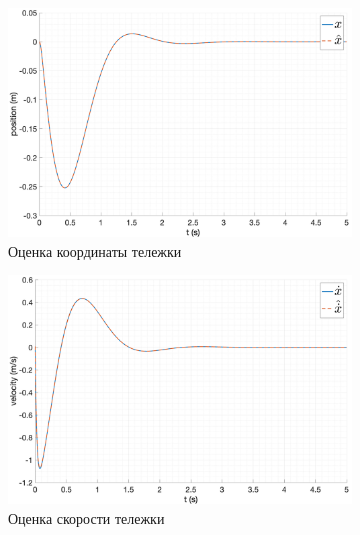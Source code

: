 \begin{figure}[ht!]
    \centering
    \begin{subfigure}[b]{0.45\textwidth}
        \includegraphics[width=\textwidth]{media/plots/reduced_observer/reduced_observer_x_cmp_1.png}
        \caption{Оценка координаты тележки}
        \label{fig:reduced_observer_x_cmp_1}
    \end{subfigure}
    \begin{subfigure}[b]{0.45\textwidth}
        \includegraphics[width=\textwidth]{media/plots/reduced_observer/reduced_observer_dotx_cmp_1.png}
        \caption{Оценка скорости тележки}
        \label{fig:reduced_observer_dotx_cmp_1}
    \end{subfigure}
    \begin{subfigure}[b]{0.45\textwidth}

\end{subfigure}
\end{figure}
